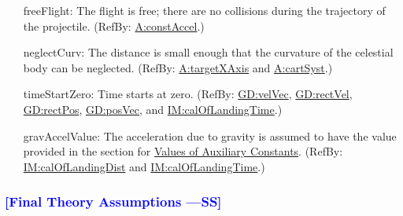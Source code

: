 \documentclass[12pt]{article}
\newcommand{\authornote}[3]{\textcolor{#1}{[#3 ---#2]}}
\newcommand{\authornote}[3]{}
\newcommand{\wss}[1]{\authornote{blue}{SS}{#1}}
\begin{document}
\begin{itemize}
\item[freeFlight:\phantomsection\label{freeFlight}]{The flight is free; there are no collisions during the trajectory of the projectile. (RefBy: \hyperref[constAccel]{A:constAccel}.)}
\item[neglectCurv:\phantomsection\label{neglectCurv}]{The distance is small enough that the curvature of the celestial body can be neglected. (RefBy: \hyperref[targetXAxis]{A:targetXAxis} and \hyperref[cartSyst]{A:cartSyst}.)}
\item[timeStartZero:\phantomsection\label{timeStartZero}]{Time starts at zero. (RefBy: \hyperref[GD:velVec]{GD:velVec}, \hyperref[GD:rectVel]{GD:rectVel}, \hyperref[GD:rectPos]{GD:rectPos}, \hyperref[GD:posVec]{GD:posVec}, and \hyperref[IM:calOfLandingTime]{IM:calOfLandingTime}.)}
\item[gravAccelValue:\phantomsection\label{gravAccelValue}]{The acceleration due to gravity is assumed to have the value provided in the section for \hyperref[Sec:AuxConstants]{Values of Auxiliary Constants}. (RefBy: \hyperref[IM:calOfLandingDist]{IM:calOfLandingDist} and \hyperref[IM:calOfLandingTime]{IM:calOfLandingTime}.)}
\end{itemize}

\subsubsection{\wss{Final Theory Assumptions}}
\end{document}
